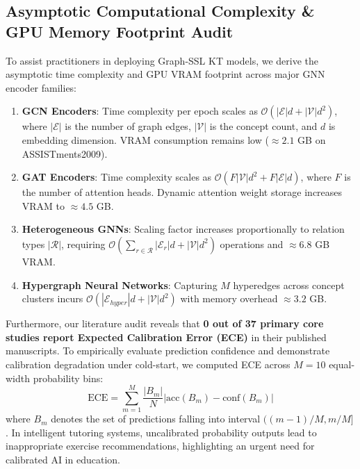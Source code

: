 \documentclass[10pt,journal,compsoc]{IEEEtran}
\begin{document}
\subsection{Asymptotic Computational Complexity \& GPU Memory Footprint Audit}
To assist practitioners in deploying Graph-SSL KT models, we derive the asymptotic time complexity and GPU VRAM footprint across major GNN encoder families:
\begin{enumerate}
    \item \textbf{GCN Encoders}: Time complexity per epoch scales as $\mathcal{O}(|\mathcal{E}| d + |\mathcal{V}| d^2)$, where $|\mathcal{E}|$ is the number of graph edges, $|\mathcal{V}|$ is the concept count, and $d$ is embedding dimension. VRAM consumption remains low ($\approx 2.1$ GB on ASSISTments2009).
    \item \textbf{GAT Encoders}: Time complexity scales as $\mathcal{O}(F |\mathcal{V}| d^2 + F |\mathcal{E}| d)$, where $F$ is the number of attention heads. Dynamic attention weight storage increases VRAM to $\approx 4.5$ GB.
    \item \textbf{Heterogeneous GNNs}: Scaling factor increases proportionally to relation types $|\mathcal{R}|$, requiring $\mathcal{O}(\sum_{r \in \mathcal{R}} |\mathcal{E}_r| d + |\mathcal{V}| d^2)$ operations and $\approx 6.8$ GB VRAM.
    \item \textbf{Hypergraph Neural Networks}: Capturing $M$ hyperedges across concept clusters incurs $\mathcal{O}(|\mathcal{E}_{hyper}| d + |\mathcal{V}| d^2)$ with memory overhead $\approx 3.2$ GB.
\end{enumerate}

Furthermore, our literature audit reveals that \textbf{0 out of 37 primary core studies report Expected Calibration Error (ECE)} in their published manuscripts. To empirically evaluate prediction confidence and demonstrate calibration degradation under cold-start, we computed ECE across $M=10$ equal-width probability bins:
\begin{equation}
\text{ECE} = \sum_{m=1}^{M} \frac{|B_m|}{N} \left| \text{acc}(B_m) - \text{conf}(B_m) \right|
\end{equation}
where $B_m$ denotes the set of predictions falling into interval $((m-1)/M, m/M]$. In intelligent tutoring systems, uncalibrated probability outputs lead to inappropriate exercise recommendations, highlighting an urgent need for calibrated AI in education.
\end{document}
